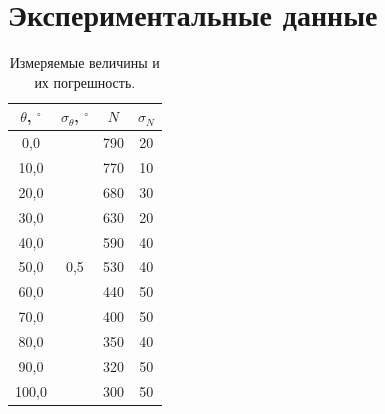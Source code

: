 \documentclass[a4paper,12pt]{article} %
\begin{document}
	\newpage
	\section{Экспериментальные данные}
	
		\begin{table}[H]
			\caption{Измеряемые величины и их погрешность.}
			\label{table:parametr}
			\begin{tabular}{|c|c|c|c|}
				\hline
				$\theta$, $^\circ$ & $\sigma_\theta$, $^\circ$ & $N$ & $\sigma_N$ \\ \hline
				0,0                & \multirow{11}{*}{0,5}     & 790 & 20         \\ \cline{1-1} \cline{3-4} 
				10,0               &                           & 770 & 10         \\ \cline{1-1} \cline{3-4} 
				20,0               &                           & 680 & 30         \\ \cline{1-1} \cline{3-4} 
				30,0               &                           & 630 & 20         \\ \cline{1-1} \cline{3-4} 
				40,0               &                           & 590 & 40         \\ \cline{1-1} \cline{3-4} 
				50,0               &                           & 530 & 40         \\ \cline{1-1} \cline{3-4} 
				60,0               &                           & 440 & 50         \\ \cline{1-1} \cline{3-4} 
				70,0               &                           & 400 & 50         \\ \cline{1-1} \cline{3-4} 
				80,0               &                           & 350 & 40         \\ \cline{1-1} \cline{3-4} 
				90,0               &                           & 320 & 50         \\ \cline{1-1} \cline{3-4} 
				100,0              &                           & 300 & 50         \\ \hline
			\end{tabular}
		\end{table}
	
\end{document}

